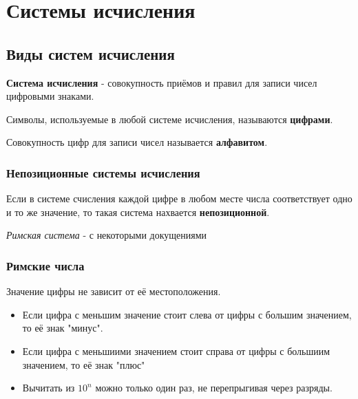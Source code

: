 
\section{Системы исчисления}
\subsection{Виды систем исчисления}

\begin{definition}
  \textbf{Система исчисления} - совокупность приёмов и правил для записи чисел цифровыми знаками.
\end{definition}

\begin{definition}
  Символы, используемые в любой системе исчисления, называются \textbf{цифрами}.
\end{definition}

\begin{definition}
  Совокупность цифр для записи чисел называется \textbf{алфавитом}.
\end{definition}

\subsubsection{Непозиционные системы исчисления}

\begin{definition}
  Если в системе счисления каждой цифре в любом месте числа соответствует одно и то же значение, то такая система нахвается \textbf{непозиционной}.
\end{definition}
\begin{eg}
  \textit{Римская система} - с некоторыми докущениями 
\end{eg}

\subsubsection*{Римские числа}

Значение цифры не зависит от её местоположения.
\begin{itemize}
  \item Если цифра с меньшим значение стоит слева от цифры с большим значением, то её знак "минус".
  \item Если цифра с меньшиими значением стоит справа от цифры с большиим значением, то её знак "плюс"
  \item Вычитать из $10^n$ можно только один раз, не перепрыгивая через разряды.
\end{itemize}

